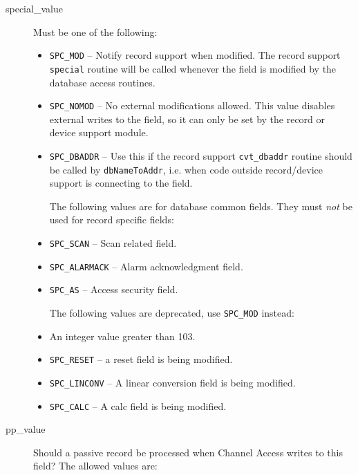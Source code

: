\begin{description}
\begin{itemize}
\end{itemize}

\item [special\_value] Must be one of the following:

\begin{itemize}
\item \verb|SPC_MOD| -- Notify record support when modified.
The record support \verb|special| routine will be called whenever the field is modified by the database access routines.

\item \verb|SPC_NOMOD| -- No external modifications allowed.
This value disables external writes to the field, so it can only be set by the record or device support module.

\item \verb|SPC_DBADDR| -- Use this if the record support \verb|cvt_dbaddr| routine should be called by \verb|dbNameToAddr|,
i.e. when code outside record/device support is connecting to the field.

The following values are for database common fields.
They must \emph{not} be used for record specific fields:

\item \verb|SPC_SCAN| -- Scan related field.

\item \verb|SPC_ALARMACK| -- Alarm acknowledgment field.

\item \verb|SPC_AS| -- Access security field.

The following values are deprecated, use \verb|SPC_MOD| instead:

\item An integer value greater than 103.

\item \verb|SPC_RESET| -- a reset field is being modified.

\item \verb|SPC_LINCONV| -- A linear conversion field is being modified.

\item \verb|SPC_CALC| -- A calc field is being modified.
\end{itemize}

\item [pp\_value] Should a passive record be processed when Channel Access writes to this field?
The allowed values are:


\end{description}
